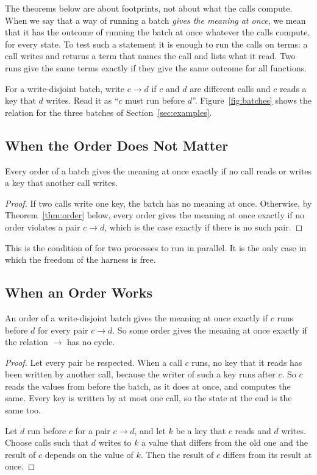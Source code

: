 \documentclass[acmsmall,nonacm,screen]{acmart}
\begin{document}
The theorems below are about footprints, not about what the calls compute. When we say that
a way of running a batch \emph{gives the meaning at once}, we mean that it has the outcome of
running the batch at once whatever the calls compute, for every state. To test such a
statement it is enough to run the calls on terms: a call writes and returns a term that
names the call and lists what it read. Two runs give the same terms exactly if they give the
same outcome for all functions.

For a write-disjoint batch, write $c \to d$ if $c$ and $d$ are different calls and $c$ reads
a key that $d$ writes. Read it as ``$c$ must run before $d$''. Figure~\ref{fig:batches} shows
the relation for the three batches of Section~\ref{sec:examples}.

\subsection{When the Order Does Not Matter}

\begin{theorem}[Independence]\label{thm:independent}
Every order of a batch gives the meaning at once exactly if no call reads or writes a key
that another call writes.
\end{theorem}

\begin{proof}
If two calls write one key, the batch has no meaning at once. Otherwise, by
Theorem~\ref{thm:order} below, every order gives the meaning at once exactly if no order
violates a pair $c \to d$, which is the case exactly if there is no such pair.
\end{proof}

This is the condition of \citet{Bernstein1966} for two processes to run in parallel. It is
the only case in which the freedom of the harness is free.

\subsection{When an Order Works}

\begin{theorem}[Orders]\label{thm:order}
An order of a write-disjoint batch gives the meaning at once exactly if $c$ runs before $d$
for every pair $c \to d$. So some order gives the meaning at once exactly if the relation
$\to$ has no cycle.
\end{theorem}

\begin{proof}
Let every pair be respected. When a call $c$ runs, no key that it reads has been written by
another call, because the writer of such a key runs after $c$. So $c$ reads the values from
before the batch, as it does at once, and computes the same. Every key is written by at most
one call, so the state at the end is the same too.

Let $d$ run before $c$ for a pair $c \to d$, and let $k$ be a key that $c$ reads and $d$
writes. Choose calls such that $d$ writes to $k$ a value that differs from the old one and
the result of $c$ depends on the value of $k$. Then the result of $c$ differs from its
result at once.
\end{proof}
\end{document}
